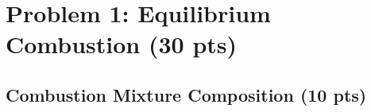 \documentclass[12pt]{article}
\begin{document}
\begin{titlepage}
\vfill %

\end{titlepage}


\section{Problem 1: Equilibrium Combustion (30 pts)}
	\subsection{Combustion Mixture Composition (10 pts)}
\end{document}
